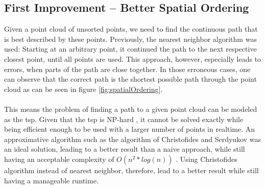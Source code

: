 \subsection{First Improvement – Better Spatial Ordering}
Given a point cloud of unsorted points, we need to find the continuous path that is best described by these points. Previously, the nearest neighbor algorithm was used: Starting at an arbitrary point, it continued the path to the next respective closest point, until all points are used. This approach, however, especially leads to errors, when parts of the path are close together. In those erroneous cases, one can observe that the correct path is the shortest possible path through the point cloud as can be seen in figure \ref{fig:spatialOrdering}.\\
\\
This means the problem of finding a path to a given point cloud can be modeled as the \ac{tsp}. Given that the \ac{tsp} is NP-hard \cite{Korte2008}, it cannot be solved exactly while being efficient enough to be used with a larger number of points in realtime. An approximative algorithm such as the algorithm of Christofides and Serdyukov was an ideal solution, leading to a better result than a naive approach, while still having an acceptable complexity of $O(n^2 * log(n))$ \cite{Christofides2022}. Using Christofides algorithm instead of nearest neighbor, therefore, lead to a better result while still having a manageable runtime. 

